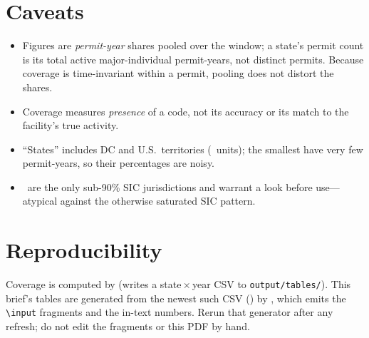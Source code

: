 \documentclass[11pt]{article}
\begin{document}
\section*{Caveats}
\begin{itemize}
  \item Figures are \emph{permit-year} shares pooled over the window; a state's
        permit count is its total active major-individual permit-years, not distinct
        permits. Because coverage is time-invariant within a permit, pooling does not
        distort the shares.
  \item Coverage measures \emph{presence} of a code, not its accuracy or its match to
        the facility's true activity.
  \item ``States'' includes DC and U.S.\ territories (\covNStates\ units); the
        smallest have very few permit-years, so their percentages are noisy.
  \item \covLoSicList\ are the only sub-90\% SIC jurisdictions and warrant a look
        before use---atypical against the otherwise saturated SIC pattern.
\end{itemize}

\section*{Reproducibility}
Coverage is computed by
 (writes a
state\,$\times$\,year CSV to \texttt{output/tables/}). This brief's tables are
generated from the newest such CSV (\covSrcFile) by
, which emits the
\texttt{\textbackslash input} fragments and the in-text numbers. Rerun that
generator after any refresh; do not edit the fragments or this PDF by hand.
\end{document}
